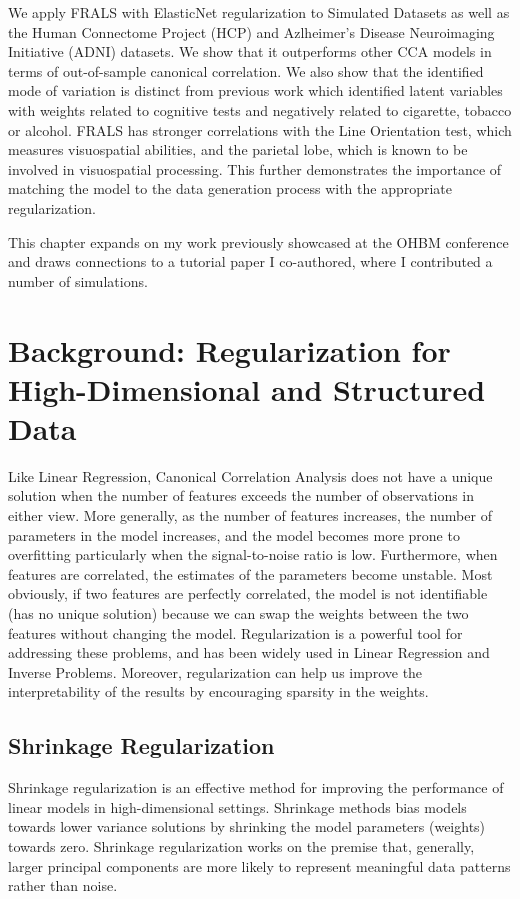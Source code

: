 We apply FRALS with ElasticNet regularization to Simulated Datasets as well as the Human Connectome Project (HCP) and Azlheimer's Disease Neuroimaging Initiative (ADNI) datasets.
We show that it outperforms other CCA models in terms of out-of-sample canonical correlation.
We also show that the identified mode of variation is distinct from previous work which identified latent variables with \gls{weights} related to cognitive tests and negatively related to cigarette, tobacco or alcohol\citep{smith2015positive}.
FRALS has stronger correlations with the Line Orientation test, which measures visuospatial abilities, and the parietal lobe, which is known to be involved in visuospatial processing.
This further demonstrates the importance of matching the model to the data generation process with the appropriate regularization.

This chapter expands on my work previously showcased at the OHBM conference and draws connections to a tutorial paper I co-authored, where I contributed a number of simulations\citep{mihalik2022canonical}.
\newpage
\section{Background: Regularization for High-Dimensional and Structured Data}\label{sec:background}

Like Linear Regression, Canonical Correlation Analysis does not have a unique solution when the number of features exceeds the number of observations in either view.
More generally, as the number of features increases, the number of parameters in the model increases, and the model becomes more prone to overfitting particularly when the signal-to-noise ratio is low.
Furthermore, when features are correlated, the estimates of the parameters become unstable.
Most obviously, if two features are perfectly correlated, the model is not identifiable (has no unique solution) because we can swap the \gls{weights} between the two features without changing the model.
Regularization is a powerful tool for addressing these problems, and has been widely used in Linear Regression and Inverse Problems.
Moreover, regularization can help us improve the interpretability of the results by encouraging sparsity in the weights.

\subsection{Shrinkage Regularization}

Shrinkage regularization is an effective method for improving the performance of linear models in high-dimensional settings.
Shrinkage methods bias models towards lower variance solutions by shrinking the model parameters (weights) towards zero.
Shrinkage regularization works on the premise that, generally, larger principal components are more likely to represent meaningful data patterns rather than noise.

